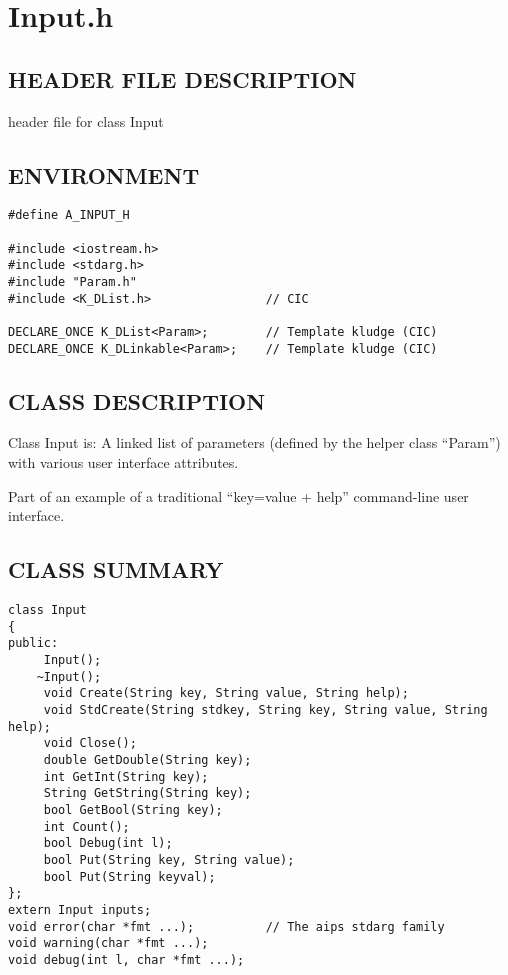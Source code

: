 \clearpage
\section{Input.h}

\subsection*{HEADER FILE DESCRIPTION}
 header file for class Input
  
\subsection*{ENVIRONMENT}
\begin{verbatim}
#define A_INPUT_H

#include <iostream.h>
#include <stdarg.h>
#include "Param.h"
#include <K_DList.h>                // CIC

DECLARE_ONCE K_DList<Param>;        // Template kludge (CIC)
DECLARE_ONCE K_DLinkable<Param>;    // Template kludge (CIC)
\end{verbatim}

\subsection*{CLASS DESCRIPTION}
   Class Input is:
      A linked list of parameters (defined by the helper class ``Param'')
      with various user interface attributes.
    
  
   Part of an example of a traditional ``key=value + help'' command-line user
   interface.
  

\subsection*{CLASS SUMMARY}
\begin{verbatim}
class Input
{
public:
     Input();
    ~Input();
     void Create(String key, String value, String help);
     void StdCreate(String stdkey, String key, String value, String help);
     void Close();
     double GetDouble(String key);
     int GetInt(String key);
     String GetString(String key);
     bool GetBool(String key);
     int Count();
     bool Debug(int l);
     bool Put(String key, String value);
     bool Put(String keyval);
};
extern Input inputs;
void error(char *fmt ...);          // The aips stdarg family
void warning(char *fmt ...);
void debug(int l, char *fmt ...);
\end{verbatim}

